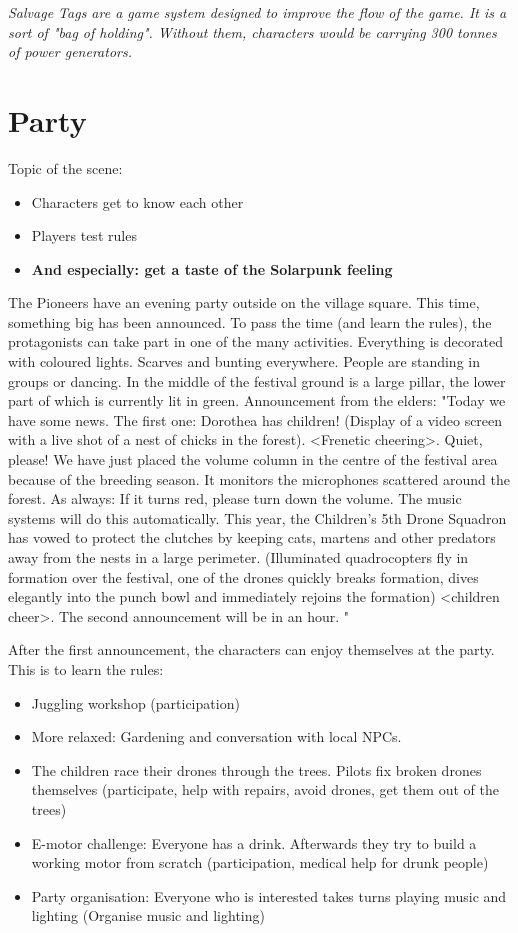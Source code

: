 \emph{Salvage Tags are a game system designed to improve the flow of the game. It is a sort of "bag of holding". Without them, characters would be carrying 300 tonnes of power generators.}


\section{Party}

Topic of the scene:
\begin{itemize}
\item Characters get to know each other
\item Players test rules
\item \textbf{And especially: get a taste of the Solarpunk feeling}
\end{itemize}

The Pioneers have an evening party outside on the village square. This time, something big has been announced. To pass the time (and learn the rules), the protagonists can take part in one of the many activities.
Everything is decorated with coloured lights. Scarves and bunting everywhere. People are standing in groups or dancing. In the middle of the festival ground is a large pillar, the lower part of which is currently lit in green.
Announcement from the elders: "Today we have some news. The first one: Dorothea has children! (Display of a video screen with a live shot of a nest of chicks in the forest). <Frenetic cheering>. Quiet, please! We have just placed the volume column in the centre of the festival area because of the breeding season.
It monitors the microphones scattered around the forest.
As always: If it turns red, please turn down the volume. The music systems will do this automatically. This year, the Children's 5th Drone Squadron has vowed to protect the clutches by keeping cats, martens and other predators away from the nests in a large perimeter. (Illuminated quadrocopters fly in formation over the festival, one of the drones quickly breaks formation, dives elegantly into the punch bowl and immediately rejoins the formation) <children cheer>.
The second announcement will be in an hour.
"

After the first announcement, the characters can enjoy themselves at the party. This is to learn the rules:

\begin{itemize}
\item Juggling workshop (participation)
\item More relaxed: Gardening and conversation with local NPCs.
\item The children race their drones through the trees. Pilots fix broken drones themselves (participate, help with repairs, avoid drones, get them out of the trees)
\item E-motor challenge: Everyone has a drink. Afterwards they try to build a working motor from scratch (participation, medical help for drunk people)
\item Party organisation: Everyone who is interested takes turns playing music and lighting (Organise music and lighting)
\end{itemize}

